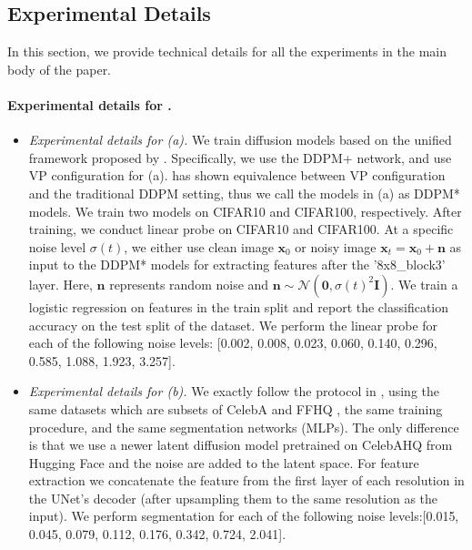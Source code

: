 

\subsection{Experimental Details}\label{app:exp_detail}
In this section, we provide technical details for all the experiments in the main body of the paper. 

\paragraph{Experimental details for .}
\begin{itemize}
    \item \textit{Experimental details for (a).} We train diffusion models based on the unified framework proposed by \citep{karras2022elucidating}. Specifically, we use the DDPM+ network, and use VP configuration for (a). \citep{karras2022elucidating} has shown equivalence between VP configuration and the traditional DDPM setting, thus we call the models in (a) as DDPM* models. We train two models on CIFAR10 and CIFAR100, respectively. After training, we conduct linear probe on CIFAR10 and CIFAR100. At a specific noise level $\sigma(t)$, we either use clean image $\bm x_0$ or noisy image $\bm x_t = \bm x_0 + \bm n$ as input to the DDPM* models for extracting features after the '8x8\_block3' layer. Here, $\bm n$ represents random noise and $\boldsymbol{n} \sim \mathcal{N}\left(\mathbf{0}, \sigma(t)^2 \mathbf{I}\right)$. We train a logistic regression on features in the train split and report the classification accuracy on the test split of the dataset. We perform the linear probe for each of the following noise levels: [0.002, 0.008, 0.023, 0.060, 0.140, 0.296, 0.585, 1.088, 1.923, 3.257].

    \item \textit{Experimental details for (b).}  We exactly follow the protocol in \citep{baranchuk2021label}, using the same datasets which are subsets of CelebA \citep{karras2018progressive} and FFHQ \citep{karras2019style}, the same training procedure, and the same segmentation networks (MLPs). The only difference is that we use a newer latent diffusion model \citep{rombach2022high} pretrained on CelebAHQ from Hugging Face and the noise are added to the latent space. For feature extraction we concatenate the feature from the first layer of each resolution in the UNet's decoder (after upsampling them to the same resolution as the input). We perform segmentation for each of the following noise levels:[0.015, 0.045, 0.079, 0.112, 0.176, 0.342, 0.724, 2.041].
\end{itemize}

